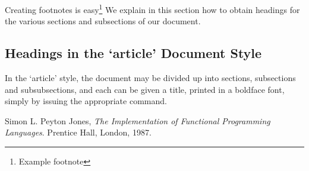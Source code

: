\documentclass[a4paper]{report}
\begin{document}
Creating footnotes is easy\footnote{Example footnote}
We explain in this section how to obtain headings
for the various sections and subsections of our
document.

\subsection{Headings in the `article' Document Style}

In the `article' style, the document may be divided up
into sections, subsections and subsubsections, and each
can be given a title, printed in a boldface font, simply by issuing the
appropriate command.

\begin{thebibliography}{9}

  Simon L. Peyton Jones,
    \emph{The Implementation of Functional Programming Languages}.
      Prentice Hall, London, 1987.

\end{thebibliography}
\end{document}
